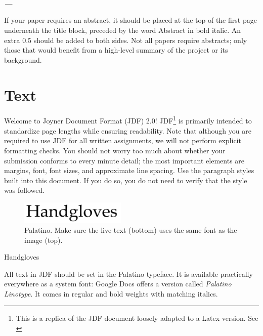\documentclass[11pt,a4paper,usenames,dvipsnames]{article}
\title{\LARGE \textbf{\projectTitle} }
\author{\authorName \\ \href{mailto:\authorEmail}{\authorEmail}}
\date{}
\renewenvironment{abstract}{%
  \list{}{\leftmargin0.5in \rightmargin\leftmargin}
  \item\relax
   \par{\bfseries \noindent \textit{\abstractname—}\nolinebreak} 
}{%
  \endlist \par
}
\begin{document}
\clearpage\maketitle
\maketitle              %
%
\begin{abstract}
If your paper requires an abstract, it should be placed at the top of the first page underneath the title block, preceded by the word Abstract in bold italic. An extra 0.5 should be added to both sides. Not all papers require abstracts; only those that would benefit from a high-level summary of the project or its background.
\end{abstract}

\section{Text}
Welcome to Joyner Document Format (JDF) 2.0! JDF\footnote{This is a replica of the JDF document loosely adapted to a Latex version. See \cite{jn2019}} is primarily intended to standardize page lengths while ensuring readability. Note that although you are required to use JDF for all written assignments, we will not perform explicit formatting checks. You should not worry too much about whether your submission conforms to every minute detail; the most important elements are margins, font, font sizes, and approximate line spacing. Use the paragraph styles built into this document. If you do so, you do not need to verify that the style was followed.
\begin{figure}[H]
\centering
\includegraphics[width=0.45\textwidth]{palantino.png}
\caption{\label{fig:pie} Palatino. Make sure the live text (bottom) uses the same font as the image (top).}
\end{figure}
\begin{center}
{\fontsize{30}{30}\selectfont Handgloves}
\end{center}

All text in JDF should be set in the Palatino typeface. It is available practically everywhere as a system font: Google Docs offers a version called \textit{Palatino Linotype}. It comes in regular and bold weights with matching italics.
\end{document}
